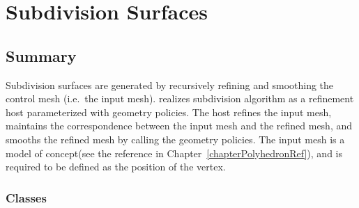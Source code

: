
\chapter{Subdivision Surfaces}
\label{chapterSubdivisionRef}


\section*{Summary}

Subdivision surfaces are generated by recursively refining and smoothing 
the control mesh (i.e.~the input mesh).  
realizes subdivision algorithm as a refinement host parameterized 
with geometry policies. The host refines the input mesh, maintains
the correspondence between the input mesh and the refined mesh, and
smooths the refined mesh by calling the geometry policies.
The input mesh is a model of  concept(see the reference in 
Chapter~\ref{chapterPolyhedronRef}), and  is required to be
defined as the position of the vertex.


\subsection*{Classes}

\\ 
\\ 
\\ 
\\ 
\\ 
\\ 
\\ 
\\ 

